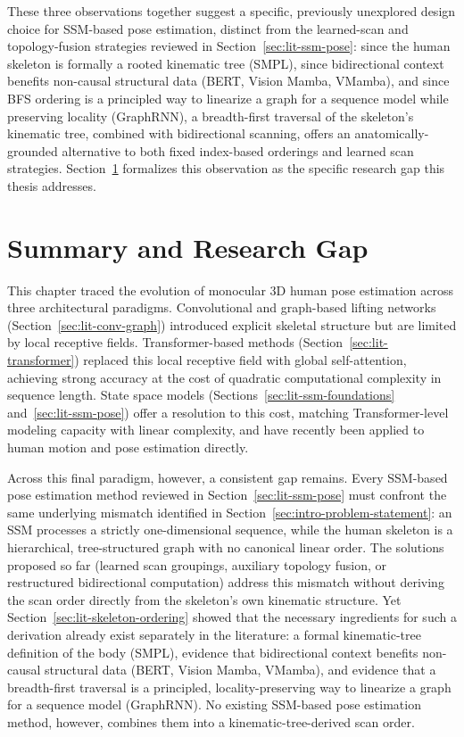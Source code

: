 These three observations together suggest a specific, previously
unexplored design choice for SSM-based pose estimation, distinct from the
learned-scan and topology-fusion strategies reviewed in
Section~\ref{sec:lit-ssm-pose}: since the human skeleton is formally a
rooted kinematic tree (SMPL), since bidirectional context benefits
non-causal structural data (BERT, Vision Mamba, VMamba), and since BFS
ordering is a principled way to linearize a graph for a sequence model
while preserving locality (GraphRNN), a breadth-first
traversal of the skeleton's kinematic tree, combined with bidirectional
scanning, offers an anatomically-grounded alternative to both fixed
index-based orderings and learned scan strategies. Section~\ref{sec:lit-summary-gap}
formalizes this observation as the specific research gap this thesis
addresses.

\section{Summary and Research Gap}
\label{sec:lit-summary-gap}

This chapter traced the evolution of monocular 3D human pose estimation
across three architectural paradigms. Convolutional and graph-based
lifting networks (Section~\ref{sec:lit-conv-graph}) introduced explicit
skeletal structure but are limited by local receptive fields.
Transformer-based methods (Section~\ref{sec:lit-transformer}) replaced
this local receptive field with global self-attention, achieving strong
accuracy at the cost of quadratic computational complexity in sequence
length. State space models (Sections~\ref{sec:lit-ssm-foundations}
and~\ref{sec:lit-ssm-pose}) offer a resolution to this cost, matching
Transformer-level modeling capacity with linear complexity, and have
recently been applied to human motion and pose estimation directly.

Across this final paradigm, however, a consistent gap remains. Every
SSM-based pose estimation method reviewed in
Section~\ref{sec:lit-ssm-pose} must confront the same underlying
mismatch identified in Section~\ref{sec:intro-problem-statement}: an SSM
processes a strictly one-dimensional sequence, while the human skeleton is
a hierarchical, tree-structured graph with no canonical linear order. The
solutions proposed so far (learned scan groupings, auxiliary topology
fusion, or restructured bidirectional computation) address this mismatch
without deriving the scan order directly from the skeleton's own
kinematic structure. Yet Section~\ref{sec:lit-skeleton-ordering} showed
that the necessary ingredients for such a derivation already exist
separately in the literature: a formal kinematic-tree definition of the
body (SMPL), evidence that bidirectional context benefits non-causal
structural data (BERT, Vision Mamba, VMamba), and evidence that a
breadth-first traversal is a principled, locality-preserving way to
linearize a graph for a sequence model (GraphRNN). No existing SSM-based
pose estimation method, however, combines them into a
kinematic-tree-derived scan order.

